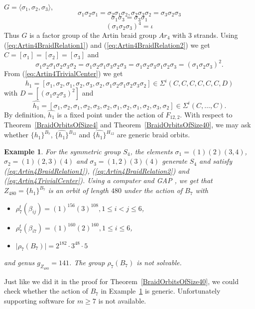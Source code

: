 \documentclass[12pt,a4paper]{article}
\newtheorem{example}{Example}[section]
\numberwithin{equation}{section}
\numberwithin{table}{section}
\begin{document}
$G=\langle \sigma_1, \sigma_2, \sigma_3 \rangle$,
\begin{equation} 
\label{eq:Artin4BraidRelation1}
\sigma_1 \sigma_2 \sigma_1 = \sigma_2 \sigma_1 \sigma_2, \sigma_2 \sigma_3 \sigma_2 = \sigma_3 \sigma_2 \sigma_3
\end{equation}
\begin{equation}
\label{eq:Artin4BraidRelation2}
\sigma_1 \sigma_3 = \sigma_3 \sigma_1
\end{equation}
\begin{equation}
\label{eq:Artin4TrivialCenter}
(\sigma_1 \sigma_2 \sigma_3)^4 = \iota
\end{equation}
Thus $G$ is a factor group of the Artin braid group $Ar_4$ with $3$ strands.
Using (\ref{eq:Artin4BraidRelation1}) and (\ref{eq:Artin4BraidRelation2}) we get 
$C = [\sigma_1] = [\sigma_2] = [\sigma_3]$ and
$$\sigma_1 \sigma_2 \sigma_1 \sigma_2 \sigma_3 \sigma_2 = \sigma_1 \sigma_2 \sigma_1 \sigma_3 \sigma_2 \sigma_3 =
\sigma_1 \sigma_2 \sigma_3 \sigma_1 \sigma_2 \sigma_3 = (\sigma_1 \sigma_2 \sigma_3)^2.$$
From (\ref{eq:Artin4TrivialCenter}) we get
$$h_1= [\sigma_1, \sigma_2, \sigma_1, \sigma_2, \sigma_3, \sigma_2,
\sigma_1 \sigma_2 \sigma_1 \sigma_2 \sigma_3 \sigma_2] \in \Sigma^i(C,C,C,C,C,C,D)$$
with $D = [(\sigma_1 \sigma_2 \sigma_3)^2]$ and
$$\widehat{h_1} = 
[\sigma_1, \sigma_2, \sigma_1, \sigma_2, \sigma_3, \sigma_2, \sigma_1, \sigma_2, \sigma_1, \sigma_2, \sigma_3, \sigma_2] 
\in \Sigma^i(C,\dots,C).$$
By definition, $\widehat{h_1}$ is a fixed point under the action of $F_{12,2}$.
With respect to Theorem~\ref{BraidOrbitsOfSize4} and Theorem~\ref{BraidOrbitsOfSize40}, we may
ask whether $\{ h_1\}^{B_7}$, $\{ \widehat{h_1} \}^{B_{12}}$ and $\{ \widehat{h_1} \}^{H_{12}}$
are generic braid orbits.
\begin{example}
\label{S4_2B2B2B2B2B2B2A_Part1}
For the symmetric group $S_4$, the elements $\sigma_1 = (1)(2)(3,4)$, $\sigma_2 = (1)(2,3)(4)$ and $\sigma_3 = (1,2)(3)(4)$
generate $S_4$ and satisfy (\ref{eq:Artin4BraidRelation1}), (\ref{eq:Artin4BraidRelation2}) and (\ref{eq:Artin4TrivialCenter}).
Using a computer and GAP \cite{RefGAP}, we get that $Z_{480} = \{ h_1\}^{B_7}$ is an orbit of length $480$
under the action of $B_7$ with
\begin{itemize}
\item[]
$\rho^t_7(\beta_{ij}) = (1)^{156} (3)^{108}, 1 \leq i < j \leq 6$,
\item[]
$\rho^t_7(\beta_{i7}) = (1)^{160} (2)^{160}, 1 \leq i \leq 6$,
\item[]
$\vert \rho_7(B_7) \vert = 2^{182} \cdot 3^{48} \cdot 5$
\end{itemize}
and genus $g_{Z_{480}}=141$.
The group $\rho_7(B_7)$ is not solvable.
\end{example}
\noindent
Just like we did it in the proof for Theorem~\ref{BraidOrbitsOfSize40}, we could check whether the action of $B_7$
in Example~\ref{S4_2B2B2B2B2B2B2A_Part1} is generic. Unfortunately supporting software for $m \geq 7$ is not available.
\end{document}
